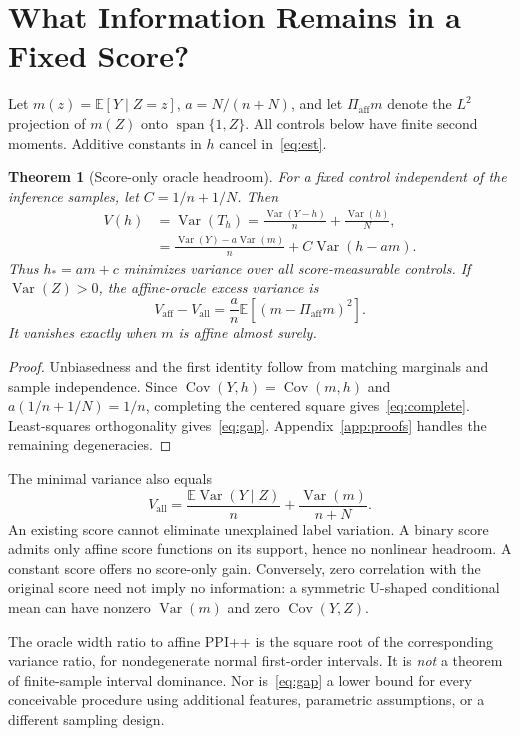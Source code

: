 \documentclass{article}
\newtheorem{theorem}{Theorem}
\newcommand{\E}{\mathbb{E}}
\newcommand{\Var}{\operatorname{Var}}
\newcommand{\Cov}{\operatorname{Cov}}
\begin{document}
\section{What Information Remains in a Fixed Score?}
\label{sec:theory}
Let $m(z)=\E[Y\mid Z=z]$, $a=N/(n+N)$, and let $\Pi_{\mathrm{aff}}m$ denote the $L^2$ projection of $m(Z)$ onto $\operatorname{span}\{1,Z\}$. All controls below have finite second moments. Additive constants in $h$ cancel in~\eqref{eq:est}.

\begin{theorem}[Score-only oracle headroom]
\label{th:oracle}
For a fixed control independent of the inference samples, let $C=1/n+1/N$. Then
\begin{align}
 V(h)&=\Var(T_h)=\frac{\Var(Y-h)}{n}+\frac{\Var(h)}{N},\\
 &=\frac{\Var(Y)-a\Var(m)}{n}+C\Var(h-am).
 \label{eq:complete}
\end{align}
Thus $h_*=am+c$ minimizes variance over all score-measurable controls. If $\Var(Z)>0$, the affine-oracle excess variance is
\begin{equation}
 V_{\mathrm{aff}}-V_{\mathrm{all}}
 =\frac an\E[(m-\Pi_{\mathrm{aff}}m)^2].
 \label{eq:gap}
\end{equation}
It vanishes exactly when $m$ is affine almost surely.
\end{theorem}
\begin{proof}
Unbiasedness and the first identity follow from matching marginals and sample independence. Since $\Cov(Y,h)=\Cov(m,h)$ and $a(1/n+1/N)=1/n$, completing the centered square gives~\eqref{eq:complete}. Least-squares orthogonality gives~\eqref{eq:gap}. Appendix~\ref{app:proofs} handles the remaining degeneracies.
\end{proof}

The minimal variance also equals
\begin{equation}
 V_{\mathrm{all}}=\frac{\E\Var(Y\mid Z)}n+
                     \frac{\Var(m)}{n+N}.
 \label{eq:oraclevar}
\end{equation}
An existing score cannot eliminate unexplained label variation. A binary score admits only affine score functions on its support, hence no nonlinear headroom. A constant score offers no score-only gain. Conversely, zero correlation with the original score need not imply no information: a symmetric U-shaped conditional mean can have nonzero $\Var(m)$ and zero $\Cov(Y,Z)$.

The oracle width ratio to affine PPI++ is the square root of the corresponding variance ratio, for nondegenerate normal first-order intervals. It is \emph{not} a theorem of finite-sample interval dominance. Nor is~\eqref{eq:gap} a lower bound for every conceivable procedure using additional features, parametric assumptions, or a different sampling design.
\end{document}
